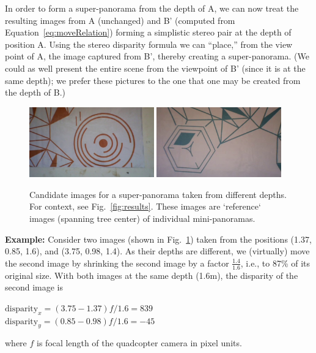In order to form a super-panorama from the depth of A, we can now
treat the resulting images from A (unchanged) and B’ (computed from
Equation~\ref{eq:moveRelation}) forming a simplistic stereo pair at
the depth of position A.  Using the stereo disparity formula we can
``place,'' from the view point of A, the image captured from B',
thereby creating a super-panorama. (We could as well present the
entire scene from the viewpoint of B' (since it is at the same depth);
we prefer these pictures to the one that one may be created from the
depth of B.)


\begin{figure}[h]
\includegraphics[width=0.48\textwidth]{images/left}
\includegraphics[width=0.48\textwidth]{images/right}
\caption[Example of super-panorama]{Candidate images for a super-panorama taken
from different depths. For context, see Fig.~\ref{fig:results}.  These images are
  `reference` images (spanning  tree center) of individual  mini-panoramas.}
\label{fig:exmaple}
\end{figure}

\textbf{Example:} Consider two images (shown in Fig.~\ref{fig:exmaple}) taken from the positions
(1.37, 0.85, 1.6), and (3.75, 0.98, 1.4).  As their depths are
different, we (virtually) move the second image by shrinking the
second image by a factor $\frac{1.4}{1.6}$, i.e., to 87\% of its
original size. With both images at the same depth (1.6m), the 
disparity of the second image is 
\begin{center}
$\text{disparity}_x = (3.75 - 1.37)f/1.6 = 839$\\
$\text{disparity}_y = (0.85 - 0.98)f/1.6 = -45$
\end{center}
where $f$ is focal length of the quadcopter camera in pixel units.

